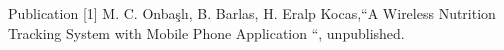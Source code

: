

\begin{cvskills}

  \cvskill
    {Publication [1]} %
    {M. C. Onbaşlı, B. Barlas, H. Eralp Kocas,“A Wireless Nutrition Tracking System with Mobile Phone Application “, unpublished.} %

\end{cvskills}
